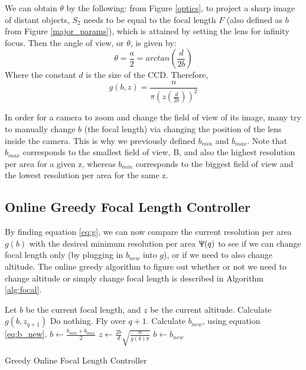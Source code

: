\documentclass[conference]{IEEEtran}
\theoremstyle{plain}%
\begin{document}
We can obtain $\theta$ by the following: from Figure \ref{optics}, to project a sharp image of distant objects, $S_2$ needs to be equal to the focal length $F$ (also defined as $b$ from Figure \ref{major_params}), which is attained by setting the lens for infinity focus. Then the angle of view, or $\theta$, is given by:
\begin{equation}
\theta = \frac{a}{2} = arctan\left(\frac{d}{2b}\right)
\end{equation}
Where the constant $d$ is the size of the CCD. Therefore,
\begin{equation} \label{eq:g}
g(b,z) = \frac{n}{\pi \left( z \left( \frac{d}{2b} \right) \right)^2}
\end{equation}

In order for a camera to zoom and change the field of view of its image, many try to manually change $b$ (the focal length) via changing the position of the lens inside the camera. This is why we previously defined $b_{min}$ and $b_{max}$. Note that $b_{max}$ corresponds to the smallest field of view, B, and also the highest resolution per area for a given z, whereas $b_{min}$ corresponds to the biggest field of view and the lowest resolution per area for the same z.

\subsection{Online Greedy Focal Length Controller}

By finding equation \ref{eq:g}, we can now compare the current resolution per area $g(b)$ with the desired minimum resolution per area $\Uppsi(q)$ to see if we can change focal length only (by plugging in $b_{new}$ into $g$), or if we need to also change altitude.
The online greedy algorithm to figure out whether or not we need to change altitude or simply change focal length is described in Algorithm \ref{alg:focal}.

\begin{algorithm}
\begin{algorithmic}[1]
\STATE Let $b$ be the current focal length, and $z$ be the current altitude.
\STATE Calculate $g(b,z_{q+1})$ 
\STATE Do nothing. Fly over $q+1$.
\ELSE 
\STATE Calculate $b_{new}$, using equation \ref{eq:b_new}.
\STATE $b \leftarrow \frac{ b_{min} + b_{max} }{ 2 }$
\STATE $z \leftarrow \frac{2b}{d}\sqrt{\frac{n}{g(b)\pi}} $
\ELSE 
\STATE $b \leftarrow b_{new}$
\ENDIF
\ENDIF
\ENDFOR
\end{algorithmic}
\caption{Greedy Online Focal Length Controller} 
\label{alg:focal}
\end{algorithm}
\end{document}
